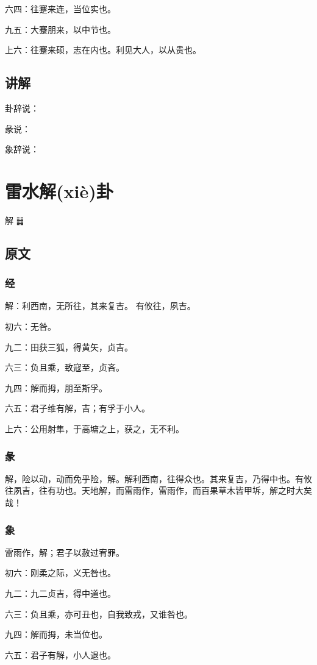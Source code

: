 \documentclass[12pt,oneside]{book}
\begin{document}
六四：往蹇来连，当位实也。

九五：大蹇朋来，以中节也。

上六：往蹇来硕，志在内也。利见大人，以从贵也。

\section{讲解}
卦辞说：

彖说：

象辞说：

\chapter{雷水解(xiè)卦}
解 {\Large ䷧}

\section{原文}

\subsection{经}
解：利西南，无所往，其来复吉。 有攸往，夙吉。

初六：无咎。

九二：田获三狐，得黄矢，贞吉。

六三：负且乘，致寇至，贞吝。

九四：解而拇，朋至斯孚。

六五：君子维有解，吉；有孚于小人。

上六：公用射隼，于高墉之上，获之，无不利。

\subsection{彖}
解，险以动，动而免乎险，解。解利西南，往得众也。其来复吉，乃得中也。有攸往夙吉，往有功也。天地解，而雷雨作，雷雨作，而百果草木皆甲坼，解之时大矣哉！

\subsection{象}
雷雨作，解；君子以赦过宥罪。

初六：刚柔之际，义无咎也。

九二：九二贞吉，得中道也。

六三：负且乘，亦可丑也，自我致戎，又谁咎也。

九四：解而拇，未当位也。

六五：君子有解，小人退也。
\end{document}
